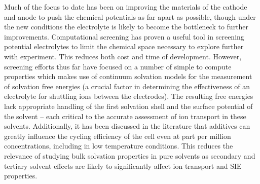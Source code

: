 \begin{intro}
   Much of the focus to date has been on improving the materials of the cathode and anode to push the chemical potentials as far apart as possible, though under the
   new conditions the electrolyte is likely to become the bottleneck to further improvements\cite{husch2015large}. Computational screening has proven a useful tool 
   in screening potential electrolytes to limit the chemical space necessary to explore further with experiment. This reduces both cost and time of 
   development\cite{husch2015large,korth2015,schutter2015toward}. However, screening efforts thus far have focused on a number of simple to compute properties
   which makes use of continuum solvation models for the measurement of solvation free energies (a crucial factor in determining the effectiveness of an electrolyte 
   for shuttling ions between the electrodes\cite{xu2010differentiating,xu2012li}). The resulting free energies lack appropriate handling of the first solvation shell 
   and the surface potential of the solvent -- each critical to the accurate assessment of ion transport in these solvents. Additionally, it has been discussed in the
   literature that additives can greatly influence the cycling efficiency of the cell even at part per million concentrations, including in low temperature 
   conditions\cite{aurbach1992behaviour,zhang2002effect}. This reduces the relevance of studying bulk solvation properties in pure solvents as secondary and tertiary
   solvent effects are likely to significantly affect ion transport and SIE properties\cite{aurbach1992behaviour}. 
   

\end{intro}
